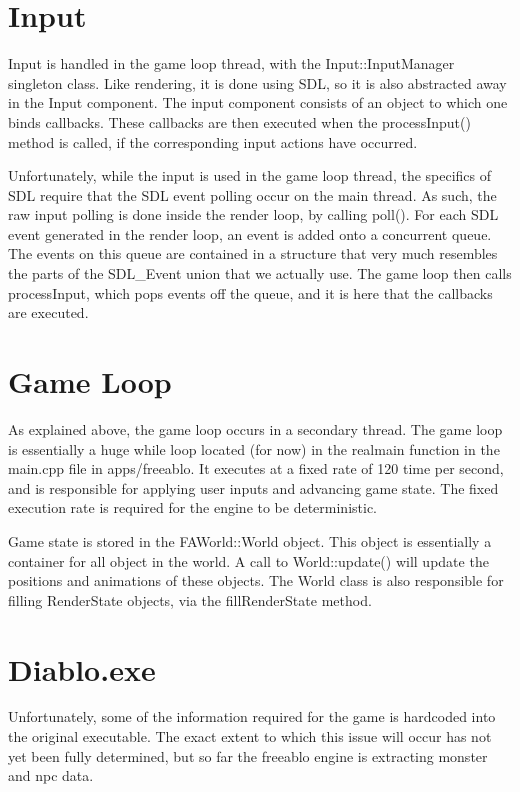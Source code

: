     \section{Input}
    Input is handled in the game loop thread, with the Input::InputManager singleton class. Like rendering, it is done using SDL, so it is also abstracted away in the Input component.
    The input component consists of an object to which one binds callbacks. These callbacks are then executed when the processInput() method is called, if the corresponding input actions have occurred.
  	
  	Unfortunately, while the input is used in the game loop thread, the specifics of SDL require that the SDL event polling occur on the main thread. As such, the raw input polling is done inside the render loop, by calling poll(). 
  	For each SDL event generated in the render loop, an event is added onto a concurrent queue. The events on this queue are contained in a structure that very much resembles the parts of the SDL\_Event union that we actually use.
  	The game loop then calls processInput, which pops events off the queue, and it is here that the callbacks are executed.

\section{Game Loop}
	As explained above, the game loop occurs in a secondary thread. The game loop is essentially a huge while loop  located (for now) in the realmain function in the main.cpp file in apps/freeablo.
	It executes at a fixed rate of 120 time per second, and is responsible for applying user inputs and advancing game state. The fixed execution rate is required for the engine to be deterministic.
	
	Game state is stored in the FAWorld::World object. This object is essentially a container for all object in the world. A call to World::update() will update the positions and animations of these objects.
	The World class is also responsible for filling RenderState objects, via the fillRenderState method.
	
\section{Diablo.exe}
	Unfortunately, some of the information required for the game is hardcoded into the original executable.
	The exact extent to which this issue will occur has not yet been fully determined, but so far the freeablo engine is extracting monster and npc data.
	
